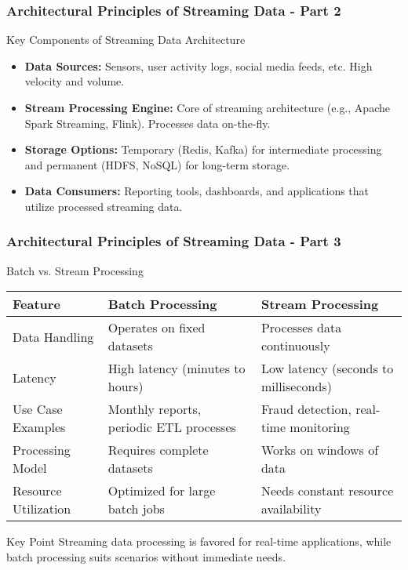 \documentclass[aspectratio=169]{beamer}
\begin{document}
\begin{frame}[fragile]
    \frametitle{Architectural Principles of Streaming Data - Part 2}
    \begin{block}{Key Components of Streaming Data Architecture}
        \begin{itemize}
            \item \textbf{Data Sources:} Sensors, user activity logs, social media feeds, etc. High velocity and volume.
            \item \textbf{Stream Processing Engine:} Core of streaming architecture (e.g., Apache Spark Streaming, Flink). Processes data on-the-fly.
            \item \textbf{Storage Options:} Temporary (Redis, Kafka) for intermediate processing and permanent (HDFS, NoSQL) for long-term storage.
            \item \textbf{Data Consumers:} Reporting tools, dashboards, and applications that utilize processed streaming data.
        \end{itemize}
    \end{block}
\end{frame}

\begin{frame}[fragile]
    \frametitle{Architectural Principles of Streaming Data - Part 3}
    \begin{block}{Batch vs. Stream Processing}
        \begin{tabular}{|l|l|l|}
            \hline
            Feature & Batch Processing & Stream Processing \\
            \hline
            Data Handling & Operates on fixed datasets & Processes data continuously \\
            Latency & High latency (minutes to hours) & Low latency (seconds to milliseconds) \\
            Use Case Examples & Monthly reports, periodic ETL processes & Fraud detection, real-time monitoring \\
            Processing Model & Requires complete datasets & Works on windows of data \\
            Resource Utilization & Optimized for large batch jobs & Needs constant resource availability \\
            \hline
        \end{tabular}
    \end{block}
    \begin{block}{Key Point}
        Streaming data processing is favored for real-time applications, while batch processing suits scenarios without immediate needs.
    \end{block}
\end{frame}
\end{document}
